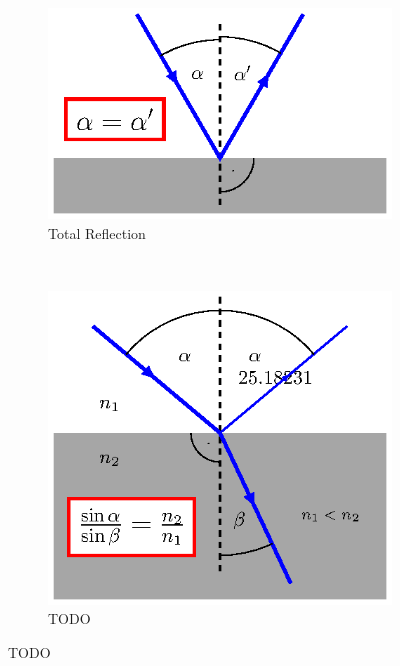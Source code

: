 \documentclass[crop,border=5,tikz,convert={outext=.svg,command=\unexpanded{pdf2svg
    \infile\space\outfile}},multi=false]{standalone}
\begin{document}
\begin{figure}[!h]
\centering
\begin{subfigure}[b]{0.45\textwidth}
\includegraphics[scale=1]{rlaw1.ps}
\caption{Total Reflection}
\end{subfigure}
~
\begin{subfigure}[b]{0.45\textwidth}
\includegraphics[scale=1]{rlaw2.ps}
\caption{TODO}
\end{subfigure}


\end{figure}
\end{document}
